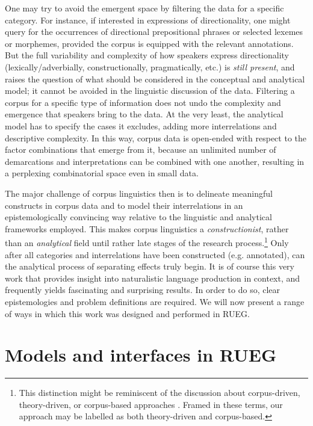 \documentclass[output=paper,colorlinks,citecolor=brown]{langscibook}
\begin{document}
One may try to avoid the emergent space by filtering the data for a specific category. For instance, if interested in expressions of directionality, one might query for the occurrences of directional prepositional phrases or selected lexemes or morphemes, provided the corpus is equipped with the relevant annotations. But the full variability and complexity of how speakers express directionality (lexically\slash adverbially, constructionally, pragmatically, etc.) is \textit{still present}, and raises the question of what should be considered in the conceptual and analytical model; it cannot be avoided in the linguistic discussion of the data. Filtering a corpus for a specific type of information does not undo the complexity and emergence that speakers bring to the data. At the very least, the analytical model has to specify the cases it excludes, adding more interrelations and descriptive complexity. In this way, corpus data is open-ended with respect to the factor combinations that emerge from it, because an unlimited number of demarcations and interpretations can be combined with one another, resulting in a perplexing combinatorial space even in small data.\largerpage

The major challenge of corpus linguistics then is to delineate meaningful constructs in corpus data and to model their interrelations in an epistemologically convincing way relative to the linguistic and analytical frameworks employed. This makes corpus linguistics a \textit{constructionist}, rather than an \textit{analytical} field until rather late stages of the research process.{\footnote{This distinction might be reminiscent of the discussion about corpus-driven, theory-driven, or corpus-based approaches \parencite{Biber2015}. Framed in these terms, our approach may be labelled as both theory-driven and corpus-based.}} Only after all categories and interrelations have been constructed (e.g. annotated), can the analytical process of separating effects truly begin. It is of course this very work that provides insight into naturalistic language production in context, and frequently yields fascinating and surprising results. In order to do so, clear epistemologies and problem definitions are required. We will now present a range of ways in which this work was designed and performed in RUEG. 

\section{Models and interfaces in RUEG} \label{sec:shadrovaetal:models_in_rueg}
\end{document}
